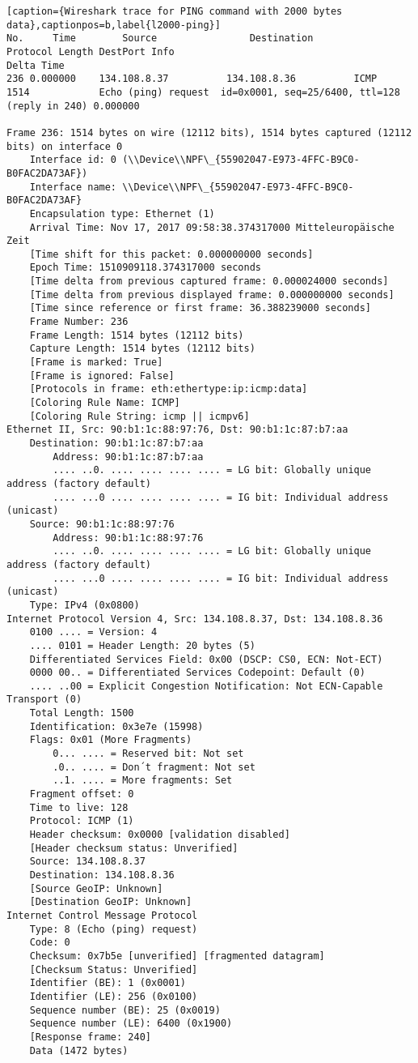 \begin{lstlisting}[caption={Wireshark trace for PING command with 2000 bytes data},captionpos=b,label{l2000-ping}]
No.     Time        Source                Destination           Protocol Length DestPort Info                                                            Delta Time
236 0.000000    134.108.8.37          134.108.8.36          ICMP     1514            Echo (ping) request  id=0x0001, seq=25/6400, ttl=128 (reply in 240) 0.000000
	
Frame 236: 1514 bytes on wire (12112 bits), 1514 bytes captured (12112 bits) on interface 0
	Interface id: 0 (\\Device\\NPF\_{55902047-E973-4FFC-B9C0-B0FAC2DA73AF})
	Interface name: \\Device\\NPF\_{55902047-E973-4FFC-B9C0-B0FAC2DA73AF}
	Encapsulation type: Ethernet (1)
	Arrival Time: Nov 17, 2017 09:58:38.374317000 Mitteleuropäische Zeit
	[Time shift for this packet: 0.000000000 seconds]
	Epoch Time: 1510909118.374317000 seconds
	[Time delta from previous captured frame: 0.000024000 seconds]
	[Time delta from previous displayed frame: 0.000000000 seconds]
	[Time since reference or first frame: 36.388239000 seconds]
	Frame Number: 236
	Frame Length: 1514 bytes (12112 bits)
	Capture Length: 1514 bytes (12112 bits)
	[Frame is marked: True]
	[Frame is ignored: False]
	[Protocols in frame: eth:ethertype:ip:icmp:data]
	[Coloring Rule Name: ICMP]
	[Coloring Rule String: icmp || icmpv6]
Ethernet II, Src: 90:b1:1c:88:97:76, Dst: 90:b1:1c:87:b7:aa
	Destination: 90:b1:1c:87:b7:aa
		Address: 90:b1:1c:87:b7:aa
		.... ..0. .... .... .... .... = LG bit: Globally unique address (factory default)
		.... ...0 .... .... .... .... = IG bit: Individual address (unicast)
	Source: 90:b1:1c:88:97:76
		Address: 90:b1:1c:88:97:76
		.... ..0. .... .... .... .... = LG bit: Globally unique address (factory default)
		.... ...0 .... .... .... .... = IG bit: Individual address (unicast)
	Type: IPv4 (0x0800)
Internet Protocol Version 4, Src: 134.108.8.37, Dst: 134.108.8.36
	0100 .... = Version: 4
	.... 0101 = Header Length: 20 bytes (5)
	Differentiated Services Field: 0x00 (DSCP: CS0, ECN: Not-ECT)
	0000 00.. = Differentiated Services Codepoint: Default (0)
	.... ..00 = Explicit Congestion Notification: Not ECN-Capable Transport (0)
	Total Length: 1500
	Identification: 0x3e7e (15998)
	Flags: 0x01 (More Fragments)
		0... .... = Reserved bit: Not set
		.0.. .... = Don´t fragment: Not set
		..1. .... = More fragments: Set
	Fragment offset: 0
	Time to live: 128
	Protocol: ICMP (1)
	Header checksum: 0x0000 [validation disabled]
	[Header checksum status: Unverified]
	Source: 134.108.8.37
	Destination: 134.108.8.36
	[Source GeoIP: Unknown]
	[Destination GeoIP: Unknown]
Internet Control Message Protocol
	Type: 8 (Echo (ping) request)
	Code: 0
	Checksum: 0x7b5e [unverified] [fragmented datagram]
	[Checksum Status: Unverified]
	Identifier (BE): 1 (0x0001)
	Identifier (LE): 256 (0x0100)
	Sequence number (BE): 25 (0x0019)
	Sequence number (LE): 6400 (0x1900)
	[Response frame: 240]
	Data (1472 bytes)
		

\end{lstlisting}
